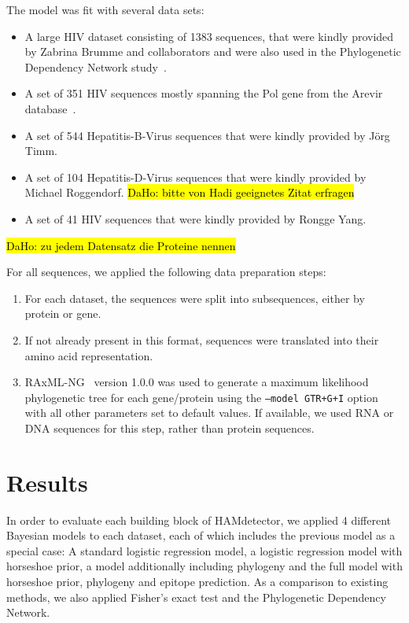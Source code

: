 \documentclass{bioinfo}
\begin{document}
\begin{methods}
The model was fit with several data sets:

\begin{itemize}
  \item A large HIV dataset consisting of 1383 sequences, that were kindly provided by Zabrina Brumme and collaborators and were also used in the Phylogenetic Dependency Network study~\citep{Carlson2008}.
  \item A set of 351 HIV sequences mostly spanning the Pol gene from the Arevir database~\citep{Roomp2006}.
  \item A set of 544 Hepatitis-B-Virus sequences that were kindly provided by Jörg Timm.
  \item A set of 104 Hepatitis-D-Virus sequences that were kindly provided by Michael Roggendorf. \hl{DaHo: bitte von Hadi geeignetes Zitat erfragen}
  \item A set of 41 HIV sequences that were kindly provided by Rongge Yang. 
\end{itemize}

\hl{DaHo: zu jedem Datensatz die Proteine nennen}

For all sequences, we applied the following data preparation steps:

\begin{enumerate}
  \item For each dataset, the sequences were split into subsequences, either by protein or gene.
  \item If not already present in this format, sequences were translated into their amino acid representation.
  \item RAxML-NG~\citep{Kozlov2019} version 1.0.0 was used to generate a maximum likelihood phylogenetic tree for each gene/protein using the \texttt{--model GTR+G+I} option with all other parameters set to default values. If available, we used RNA or DNA sequences for this step, rather than protein sequences.
\end{enumerate}

\end{methods}

\section{Results} \label{sec:results}

In order to evaluate each building block of HAMdetector, we applied 4 different Bayesian models to each dataset, each of which includes the previous model as a special case:
A standard logistic regression model, a logistic regression model with horseshoe prior, a model additionally including phylogeny and the full model with horseshoe prior, phylogeny and epitope prediction.
As a comparison to existing methods, we also applied Fisher's exact test and the Phylogenetic Dependency Network.
\end{document}
